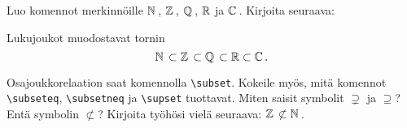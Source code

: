     \begin{harj}
        Luo komennot merkinnöille \(\mathbb{N}\,\), \(\mathbb{Z}\,\), \(\mathbb{Q}\,\), \(\mathbb{R}\) ja \(\mathbb{C}\,\). Kirjoita seuraava:
        \begin{sample}
            Lukujoukot muodostavat tornin
            \[
                \mathbb{N}\,\subset \mathbb{Z}\,\subset \mathbb{Q}\,\subset \mathbb{R}\subset \mathbb{C}\,.
            \]
        \end{sample}
        Osajoukkorelaation saat komennolla \lstinline-\subset-. Kokeile myös, mitä komennot \lstinline-\subseteq-, \lstinline-\subsetneq- ja  \lstinline-\supset- tuottavat. Miten saisit symbolit \(\supsetneq\) ja  \(\supseteq\)? Entä symbolin \(\not\subset\)?
        \vaihto
        Kirjoita työhösi vielä seuraava: \(\mathbb{Z}\,\not\subset\mathbb{N}\,\).
    \end{harj}
